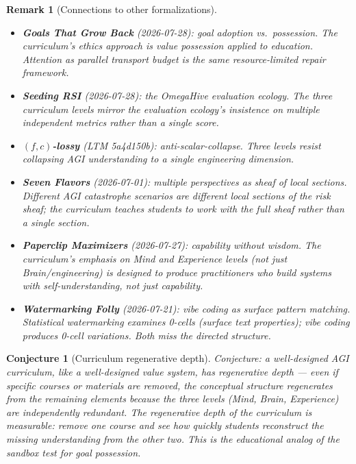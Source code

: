 \documentclass[11pt,a4paper]{article}
\newtheorem{conjecture}[definition]{Conjecture}
\newtheorem{remark}[definition]{Remark}
\begin{document}
\begin{remark}[Connections to other formalizations]
\begin{itemize}
\item \textbf{Goals That Grow Back} (2026-07-28): goal adoption vs.\
  possession. The curriculum's ethics approach is value possession
  applied to education. Attention as parallel transport budget is the
  same resource-limited repair framework.
\item \textbf{Seeding RSI} (2026-07-28): the OmegaHive evaluation
  ecology. The three curriculum levels mirror the evaluation ecology's
  insistence on multiple independent metrics rather than a single score.
\item \textbf{$(f,c)$-lossy} (LTM 5a4d150b): anti-scalar-collapse.
  Three levels resist collapsing AGI understanding to a single
  engineering dimension.
\item \textbf{Seven Flavors} (2026-07-01): multiple perspectives as
  sheaf of local sections. Different AGI catastrophe scenarios are
  different local sections of the risk sheaf; the curriculum teaches
  students to work with the full sheaf rather than a single section.
\item \textbf{Paperclip Maximizers} (2026-07-27): capability without
  wisdom. The curriculum's emphasis on Mind and Experience levels
  (not just Brain/engineering) is designed to produce practitioners
  who build systems with self-understanding, not just capability.
\item \textbf{Watermarking Folly} (2026-07-21): vibe coding as surface
  pattern matching. Statistical watermarking examines 0-cells (surface
  text properties); vibe coding produces 0-cell variations. Both miss
  the directed structure.
\end{itemize}
\end{remark}

\begin{conjecture}[Curriculum regenerative depth]
Conjecture: a well-designed AGI curriculum, like a well-designed value
system, has regenerative depth --- even if specific courses or materials
are removed, the conceptual structure regenerates from the remaining
elements because the three levels (Mind, Brain, Experience) are
independently redundant. The regenerative depth of the curriculum is
measurable: remove one course and see how quickly students reconstruct
the missing understanding from the other two. This is the educational
analog of the sandbox test for goal possession.
\end{conjecture}
\end{document}
